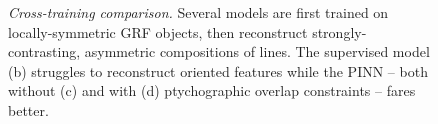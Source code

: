 \documentclass[sn-mathphys]{sn-jnl}%
\theoremstyle{thmstyleone}%
\theoremstyle{thmstyletwo}%
\theoremstyle{thmstylethree}%
\begin{document}
\begin{figure}%
    \centering
    
    \caption{\emph{Cross-training comparison.} Several models are first trained on locally-symmetric GRF objects, then reconstruct strongly-contrasting, asymmetric compositions of lines. The supervised model (b) struggles to reconstruct oriented features while the PINN -- both without (c) and with (d) ptychographic overlap constraints -- fares better.}
\label{fig:gen}%
\end{figure}
\end{document}
